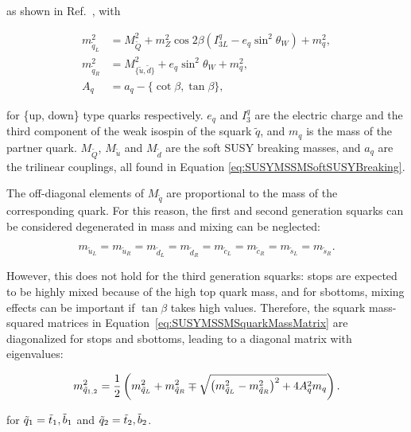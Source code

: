 \noindent as shown in Ref.~\cite{Kraml:1999qd}, with

\begin{equation}
\begin{split}
m^2_{\tilde{q}_L} &= M^2_{\tilde{Q}} + m_Z^2 \cos{2\beta} (I^q_{3L} - e_q \sin^2{\theta_W}) + m^2_q, \\
m^2_{\tilde{q}_R} &= M^2_{\{\tilde{u}, \tilde{d}\}} + e_q \sin^2{\theta_W} + m^2_q, \\
A_q &= a_q - \{\cot{\beta}, \tan\beta\},
\end{split}
\label{eq:SUSYMSSMSquarkMassGaugeBasis}
\end{equation}

\noindent for \{up, down\} type quarks respectively.
$e_q$ and $I^q_{3}$ are the electric charge and the third component of the weak isospin of the squark $\tilde{q}$, and $m_q$ is the mass of the partner quark.
$M_{\tilde{Q}}$, $M_{\tilde{u}}$ and $M_{\tilde{d}}$ are the soft SUSY breaking masses, and $a_q$ are the trilinear couplings, all found in Equation \ref{eq:SUSYMSSMSoftSUSYBreaking}.

The off-diagonal elements of $M_{\tilde{q}}$ are proportional to the mass of the corresponding quark.
For this reason, the first and second generation squarks can be considered degenerated in mass and mixing can be neglected:

\begin{equation}
m_{\tilde{u}_L} = m_{\tilde{u}_R} = m_{\tilde{d}_L} = m_{\tilde{d}_R} = m_{\tilde{c}_L} = m_{\tilde{c}_R} = m_{\tilde{s}_L} = m_{\tilde{s}_R}.
\label{eq:SUSYMSSMSquarkMass1st2nd}
\end{equation}

However, this does not hold for the third generation squarks: stops are expected to be highly mixed because of the high top quark mass, and for sbottoms, mixing effects can be important if $\tan\beta$ takes high values.
Therefore, the squark mass-squared matrices in Equation~\ref{eq:SUSYMSSMSquarkMassMatrix} are diagonalized for stops and sbottoms, leading to a diagonal matrix with eigenvalues:

\begin{equation}
m^2_{\tilde{q}_{1,2}} = \frac{1}{2} \left( m^2_{\tilde{q}_L} + m^2_{\tilde{q}_R} \mp \sqrt{\left( m^2_{\tilde{q}_L} -  m^2_{\tilde{q}_R}\right)^2 + 4A^2_q m_q} \right).
\label{eq:SUSYMSSMSquarkMass3rd}
\end{equation}

\noindent for $\tilde{q}_1=\tilde{t}_1,\tilde{b}_1$ and $\tilde{q}_2=\tilde{t}_2,\tilde{b}_2$.

